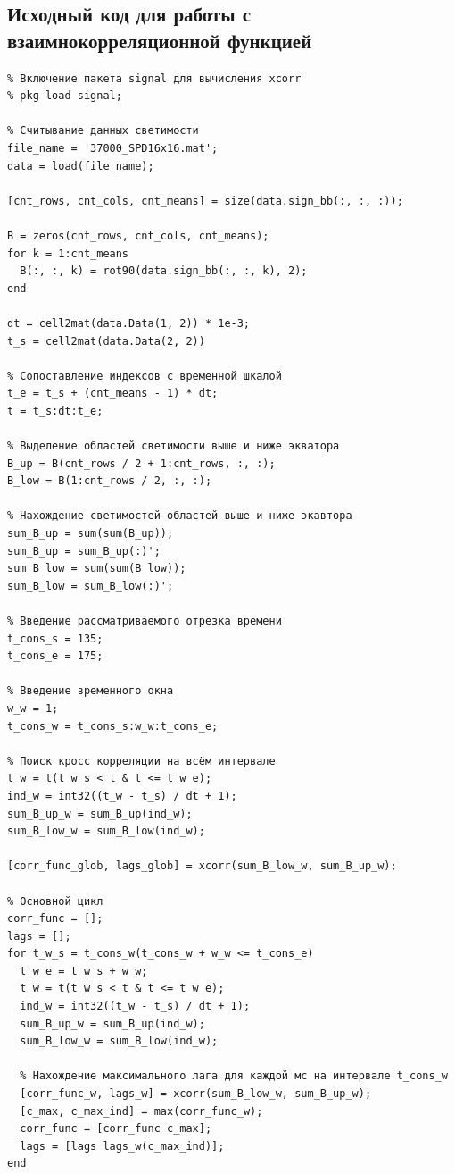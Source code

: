 \documentclass[12pt]{article}
\begin{document}
\subsection{Исходный код для работы с взаимнокорреляционной функцией}
\begin{verbatim}
% Включение пакета signal для вычисления xcorr
% pkg load signal;

% Считывание данных светимости
file_name = '37000_SPD16x16.mat';
data = load(file_name);

[cnt_rows, cnt_cols, cnt_means] = size(data.sign_bb(:, :, :));

B = zeros(cnt_rows, cnt_cols, cnt_means);
for k = 1:cnt_means
  B(:, :, k) = rot90(data.sign_bb(:, :, k), 2);
end

dt = cell2mat(data.Data(1, 2)) * 1e-3;
t_s = cell2mat(data.Data(2, 2))

% Сопоставление индексов с временной шкалой
t_e = t_s + (cnt_means - 1) * dt;
t = t_s:dt:t_e;  

% Выделение областей светимости выше и ниже экватора
B_up = B(cnt_rows / 2 + 1:cnt_rows, :, :);
B_low = B(1:cnt_rows / 2, :, :);

% Нахождение светимостей областей выше и ниже экавтора
sum_B_up = sum(sum(B_up));
sum_B_up = sum_B_up(:)';
sum_B_low = sum(sum(B_low));
sum_B_low = sum_B_low(:)';

% Введение рассматриваемого отрезка времени
t_cons_s = 135;
t_cons_e = 175;

% Введение временного окна
w_w = 1;
t_cons_w = t_cons_s:w_w:t_cons_e;

% Поиск кросс корреляции на всём интервале
t_w = t(t_w_s < t & t <= t_w_e);
ind_w = int32((t_w - t_s) / dt + 1);
sum_B_up_w = sum_B_up(ind_w);
sum_B_low_w = sum_B_low(ind_w);

[corr_func_glob, lags_glob] = xcorr(sum_B_low_w, sum_B_up_w);

% Основной цикл
corr_func = [];
lags = [];
for t_w_s = t_cons_w(t_cons_w + w_w <= t_cons_e)
  t_w_e = t_w_s + w_w;
  t_w = t(t_w_s < t & t <= t_w_e);
  ind_w = int32((t_w - t_s) / dt + 1);
  sum_B_up_w = sum_B_up(ind_w);
  sum_B_low_w = sum_B_low(ind_w);
  
  % Нахождение максимального лага для каждой мс на интервале t_cons_w
  [corr_func_w, lags_w] = xcorr(sum_B_low_w, sum_B_up_w);
  [c_max, c_max_ind] = max(corr_func_w);
  corr_func = [corr_func c_max];
  lags = [lags lags_w(c_max_ind)];
end
\end{verbatim} \cite{doc}

\end{document}
